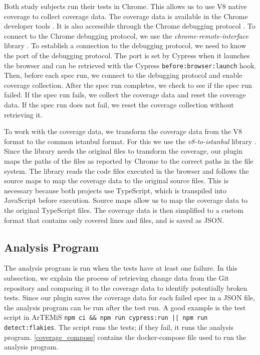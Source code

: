 Both study subjects run their tests in Chrome.
This allows us to use V8 native coverage to collect coverage data.
The coverage data is available in the Chrome developer tools \autocite{basques_coverage_2020}.
It is also accessible through the Chrome debugging protocol \autocite{noauthor_chrome_nodate}.
To connect to the Chrome debugging protocol, we use the \emph{chrome-remote-interface} library \autocite{cardaci_chrome-remote-interface_2023}.
To establish a connection to the debugging protocol, we need to know the port of the debugging protocol.
The port is set by Cypress when it launches the browser and can be retrieved with the Cypress \texttt{before:browser:launch} hook.
Then, before each spec run, we connect to the debugging protocol and enable coverage collection.
After the spec run completes, we check to see if the spec run failed.
If the spec run fails, we collect the coverage data and reset the coverage data.
If the spec run does not fail, we reset the coverage collection without retrieving it.

To work with the coverage data, we transform the coverage data from the V8 format to the common istanbul format.
For this we use the \emph{v8-to-istanbul} library \autocite{noauthor_v8--istanbul_2023}.
Since the library needs the original files to transform the coverage, our plugin maps the paths of the files as reported by Chrome to the correct paths in the file system.
The library reads the code files executed in the browser and follows the source maps to map the coverage data to the original source files.
This is necessary because both projects use TypeScript, which is transpiled into JavaScript before execution.
Source maps allow us to map the coverage data to the original TypeScript files.
The coverage data is then simplified to a custom format that contains only covered lines and files, and is saved as JSON.

\subsection{Analysis Program}
The analysis program is run when the tests have at least one failure.
In this subsection, we explain the process of retrieving change data from the Git repository and comparing it to the coverage data to identify potentially broken tests.
Since our plugin saves the coverage data for each failed spec in a JSON file, the analysis program can be run after the test run.
A good example is the test script in ArTEMiS \texttt{npm ci \&\& npm run cypress:run || npm run detect:flakies}. The script runs the tests; if they fail, it runs the analysis program.
\cref{coverage_compose} contains the docker-compose file used to run the analysis program.

